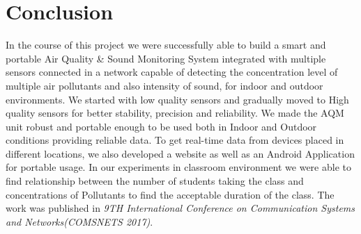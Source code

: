 \chapter{Conclusion}
In the course of this project we were successfully able to  build a smart and portable Air Quality \& Sound Monitoring System integrated with multiple sensors connected in a network capable of detecting the concentration level of multiple air pollutants and also intensity of sound, for indoor and outdoor environments. We started with low quality sensors and  gradually moved to High quality sensors for better stability, precision and reliability. We made the AQM unit robust and portable enough to be used both in Indoor and Outdoor conditions providing reliable data. To get real-time data from devices placed in different locations, we also developed a website as well as an Android Application for portable usage. In our experiments in classroom environment we were able to find relationship between the number of students taking the class and concentrations of Pollutants to find the acceptable duration of the class. The work \cite{31} was  published in \textit{9TH International Conference on Communication Systems and Networks(COMSNETS 2017)}.
